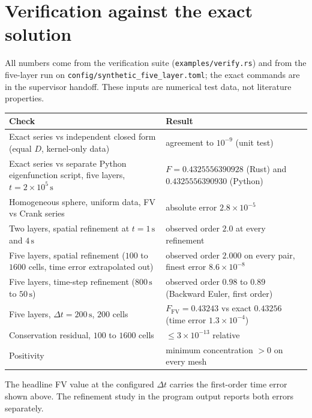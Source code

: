 \documentclass[11pt]{article}
\begin{document}
\section{Verification against the exact solution}\label{sec:verification}
All numbers come from the verification suite (\texttt{examples/verify.rs}) and from the five-layer run on \texttt{config/synthetic\_five\_layer.toml}; the exact commands are in the supervisor handoff. These inputs are numerical test data, not literature properties.
\begin{center}
\begin{tabular}{@{}>{\raggedright\arraybackslash}p{}>{\raggedright\arraybackslash}p{}@{}}
\toprule
Check & Result\\
\midrule
Exact series vs independent closed form (equal $D$, kernel-only data) & agreement to $10^{-9}$ (unit test)\\
Exact series vs separate Python eigenfunction script, five layers, $t=2\times10^5\,\mathrm{s}$ & $F=0.4325556390928$ (Rust) and $0.4325556390930$ (Python)\\
Homogeneous sphere, uniform data, FV vs Crank series & absolute error $2.8\times10^{-5}$\\
Two layers, spatial refinement at $t=1\,\mathrm{s}$ and $4\,\mathrm{s}$ & observed order $2.0$ at every refinement\\
Five layers, spatial refinement ($100$ to $1600$ cells, time error extrapolated out) & observed order $2.000$ on every pair, finest error $8.6\times10^{-8}$\\
Five layers, time-step refinement ($800\,\mathrm{s}$ to $50\,\mathrm{s}$) & observed order $0.98$ to $0.89$ (Backward Euler, first order)\\
Five layers, $\Delta t=200\,\mathrm{s}$, $200$ cells & $F_{\mathrm{FV}}=0.43243$ vs exact $0.43256$ (time error $1.3\times10^{-4}$)\\
Conservation residual, $100$ to $1600$ cells & $\le3\times10^{-13}$ relative\\
Positivity & minimum concentration $>0$ on every mesh\\
\bottomrule
\end{tabular}
\end{center}
The headline FV value at the configured $\Delta t$ carries the first-order time error shown above. The refinement study in the program output reports both errors separately.
\end{document}
